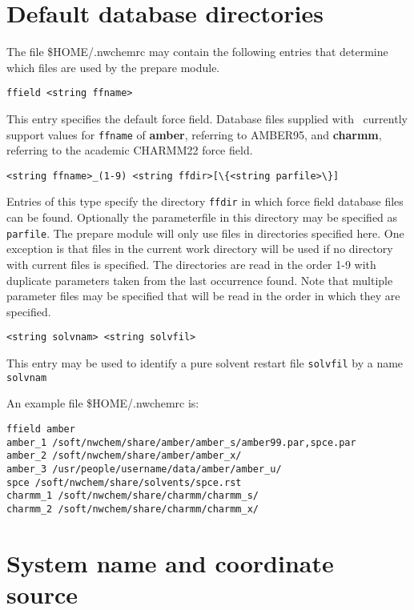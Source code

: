 \section{Default database directories}

The file \$HOME/.nwchemrc may contain the following entries that determine
which files are used by the prepare module.

\begin{verbatim}
ffield <string ffname>
\end{verbatim}

This entry specifies the default force field. Database files supplied with
\nwchem\ currently support values for \verb+ffname+ of {\bf amber}, referring 
to AMBER95, and {\bf charmm}, referring to the academic CHARMM22 force field.

\begin{verbatim}
<string ffname>_(1-9) <string ffdir>[\{<string parfile>\}]
\end{verbatim}

Entries of this type specify the directory \verb+ffdir+ in which force field 
database files can be found. Optionally the parameterfile in this directory
may be specified as \verb+parfile+. 
The prepare module will only use files in directories
specified here. One exception is that files in the current work directory
will be used if no directory with current files is specified. The directories
are read in the order 1-9 with duplicate parameters taken from the last
occurrence found. Note that multiple parameter files may be specified that will
be read in the order in which they are specified.

\begin{verbatim}
<string solvnam> <string solvfil>
\end{verbatim}

This entry may be used to identify a pure solvent restart file \verb+solvfil+
by a name \verb+solvnam+

An example file \$HOME/.nwchemrc is:

\begin{verbatim}
ffield amber
amber_1 /soft/nwchem/share/amber/amber_s/amber99.par,spce.par
amber_2 /soft/nwchem/share/amber/amber_x/
amber_3 /usr/people/username/data/amber/amber_u/
spce /soft/nwchem/share/solvents/spce.rst
charmm_1 /soft/nwchem/share/charmm/charmm_s/
charmm_2 /soft/nwchem/share/charmm/charmm_x/
\end{verbatim}

\section{System name and coordinate source}

